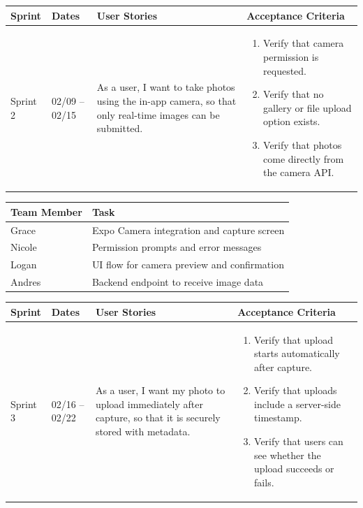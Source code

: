 \documentclass[11pt]{article}
\begin{document}
\vspace{0.5em}

\noindent
\begin{tabular}{|L{1.2cm}|L{1.8cm}|L{5.2cm}|L{6.3cm}|}
\hline
\textbf{Sprint} & \textbf{Dates} & \textbf{User Stories} & \textbf{Acceptance Criteria} \\
\hline
Sprint 2 & 02/09 -- 02/15 &
As a user, I want to take photos using the in-app camera, so that only real-time images can be submitted. &
\begin{enumerate}
    \item Verify that camera permission is requested.
    \item Verify that no gallery or file upload option exists.
    \item Verify that photos come directly from the camera API.
\end{enumerate} \\
\hline
\end{tabular}

\vspace{0.5em}

\noindent
\begin{tabular}{|L{2.5cm}|L{12.5cm}|}
\hline
\textbf{Team Member} & \textbf{Task} \\
\hline
Grace & Expo Camera integration and capture screen \\
\hline
Nicole & Permission prompts and error messages \\
\hline
Logan & UI flow for camera preview and confirmation \\
\hline
Andres & Backend endpoint to receive image data \\
\hline
\end{tabular}

\vspace{2em}


\vspace{0.5em}

\noindent
\begin{tabular}{|L{1.2cm}|L{1.8cm}|L{5.2cm}|L{6.3cm}|}
\hline
\textbf{Sprint} & \textbf{Dates} & \textbf{User Stories} & \textbf{Acceptance Criteria} \\
\hline
Sprint 3 & 02/16 -- 02/22 &
As a user, I want my photo to upload immediately after capture, so that it is securely stored with metadata. &
\begin{enumerate}
    \item Verify that upload starts automatically after capture.
    \item Verify that uploads include a server-side timestamp.
    \item Verify that users can see whether the upload succeeds or fails.
\end{enumerate} \\
\hline
\end{tabular}
\end{document}
